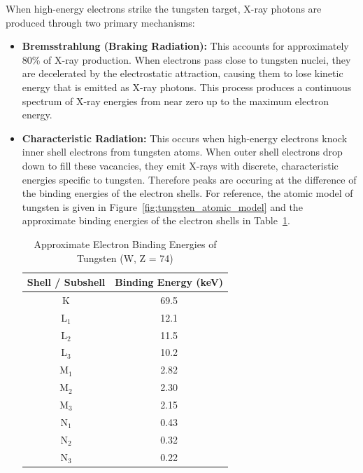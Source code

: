 When high-energy electrons strike the tungsten target, X-ray photons are
produced through two primary mechanisms:

\begin{itemize}
    \item \textbf{Bremsstrahlung (Braking Radiation):} This accounts for
    approximately 80\% of X-ray production. When electrons pass close to
    tungsten nuclei, they are decelerated by the electrostatic attraction,
    causing them to lose kinetic energy that is emitted as X-ray photons. This
    process produces a continuous spectrum of X-ray energies from near zero up
    to the maximum electron energy.

    \item \textbf{Characteristic Radiation:} This occurs when high-energy
    electrons knock inner shell electrons from tungsten atoms. When outer shell
    electrons drop down to fill these vacancies, they emit X-rays with discrete,
    characteristic energies specific to tungsten. Therefore peaks are occuring
    at the difference of the binding energies of the electron shells. For
    reference, the atomic model of tungsten is given in
    Figure~\ref{fig:tungsten_atomic_model} and the approximate binding energies
    of the electron shells in Table~\ref{tab:tungsten_binding_energies}.

    \begin{table}[!h]
        \centering
        \begin{tabular}{cc}
            \toprule
            \textbf{Shell / Subshell} & \textbf{Binding Energy (keV)} \\
            \midrule
            K        & 69.5 \\
            L$_1$    & 12.1 \\
            L$_2$    & 11.5 \\
            L$_3$    & 10.2 \\
            M$_1$    & 2.82 \\
            M$_2$    & 2.30 \\
            M$_3$    & 2.15 \\
            N$_1$    & 0.43 \\
            N$_2$    & 0.32 \\
            N$_3$    & 0.22 \\
            \bottomrule
        \end{tabular}
        \caption{Approximate Electron Binding Energies of Tungsten (W, Z = 74)}
        \label{tab:tungsten_binding_energies}
    \end{table}


\end{itemize}
